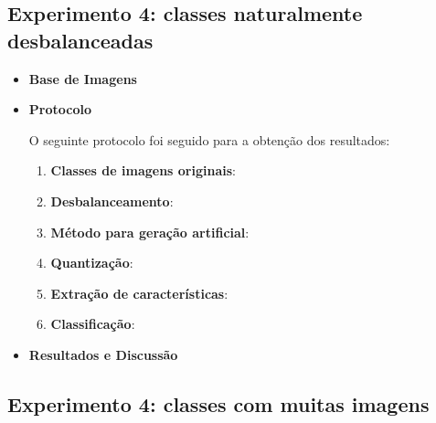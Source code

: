 \subsection{Experimento 4: classes naturalmente desbalanceadas}

\begin{itemize}
\item[] \textbf{Base de Imagens}


\item[] \textbf{Protocolo}

O seguinte protocolo foi seguido para a obtenção dos resultados:

\begin{enumerate}
\item \textbf{Classes de imagens originais}:
\item \textbf{Desbalanceamento}:
\item \textbf{Método para geração artificial}:
\item \textbf{Quantização}:
\item \textbf{Extração de características}:
\item \textbf{Classificação}:
\end{enumerate}
\item[] \textbf{Resultados e Discussão}

\end{itemize}

\subsection{Experimento 4: classes com muitas imagens}

